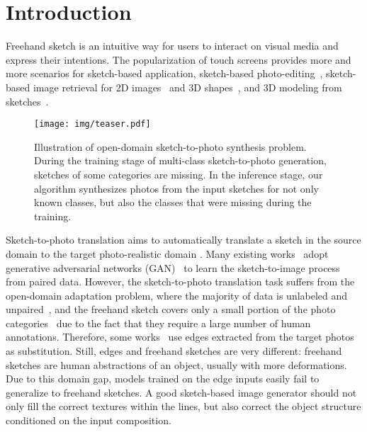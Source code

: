 \documentclass[10pt,twocolumn,letterpaper]{article}
\begin{document}
\section{Introduction}
Freehand sketch is an intuitive way for users to interact on visual media and express their intentions. The popularization of touch screens provides more and more scenarios for sketch-based application, \eg sketch-based photo-editing~\cite{portenier2018faceshop,dekel2018sparse,jo2019sc,olszewski2020intuitive,yang2020deep}, sketch-based image retrieval for 2D images~\cite{yu2016sketch,song2017deep,liu2017deep,zhang2018generative,yelamarthi2018zero,pang2019generalising,dey2019doodle,collomosse2019livesketch,dutta2019semantically,bhunia2020sketch,liu2020scenesketcher, Bhunia_2021_CVPR_2} and 3D shapes~\cite{wang2015sketch,zhu2016learning,dai2017deep,xie2017learning,chen2018deep}, and 3D modeling from sketches~\cite{lun20173d,han2017deepsketch2face,shen2019deepsketchhair}.

\begin{figure}[t]
    \centering
    \texttt{[image: img/teaser.pdf]}
\caption{Illustration of open-domain sketch-to-photo synthesis problem. During the training stage of multi-class sketch-to-photo generation, sketches of some categories are missing. 
    In the inference stage, our algorithm synthesizes photos from the input sketches for not only known classes, but also the classes that were missing during the training. }
    \label{fig:illustration}
\end{figure}

Sketch-to-photo translation aims to automatically translate a sketch in the source domain  to the target photo-realistic domain . Many existing works~\cite{isola2017image,chen2018sketchygan,lu2018image,ghosh2019interactive,li2019linestofacephoto,gao2020sketchycoco,chen2020deepfacedrawing,li2020deepfacepencil} adopt generative adversarial networks (GAN)~\cite{goodfellow2014generative} to learn the sketch-to-image process from paired data. However, the sketch-to-photo translation task suffers from the open-domain adaptation problem, where the majority of data is unlabeled and unpaired~\cite{eitz2012humans,yi2014bmvc,li2017deeper,ha2017neural,zou2018sketchyscene,caesar2018coco,li2019photo}, and the freehand sketch covers only a small portion of the photo categories~\cite{sangkloy2016sketchy,yu2016sketch,song2017deep,liu2019unpaired,ghosh2019interactive} due to the fact that they require a large number of human annotations. Therefore, some works~\cite{isola2017image,li2019linestofacephoto,chen2020deepfacedrawing,li2020deepfacepencil} use edges extracted from the target photos as substitution. Still, edges and freehand sketches are very different: freehand sketches are human abstractions of an object, usually with more deformations. Due to this domain gap, models trained on the edge inputs easily fail to generalize to freehand sketches. A good sketch-based image generator should not only fill the correct textures within the lines, but also correct the object structure conditioned on the input composition. 
\end{document}

